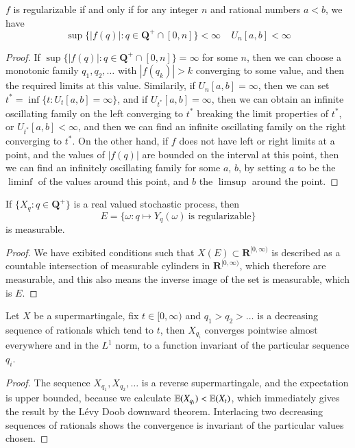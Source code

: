 \begin{lemma}
    $f$ is regularizable if and only if for any integer $n$ and rational numbers $a < b$, we have
    \[ \sup \{ |f(q)|: q \in \mathbf{Q}^+ \cap [0,n] \} < \infty\ \ \ \ \ U_n[a,b] < \infty \]
\end{lemma}
\begin{proof}
    If $\sup \{ |f(q)|: q \in \mathbf{Q}^+ \cap [0,n] \} = \infty$ for some $n$, then we can choose a monotonic family $q_1, q_2, \dots$ with $|f(q_k)| > k$ converging to some value, and then the required limits at this value. Similarily, if $U_n[a,b] = \infty$, then we can set $t^* = \inf \{ t: U_t[a,b] = \infty \}$, and if $U_{t^*}[a,b] = \infty$, then we can obtain an infinite oscillating family on the left converging to $t^*$ breaking the limit properties of $t^*$, or $U_{t^*}[a,b] < \infty$, and then we can find an infinite oscillating family on the right converging to $t^*$. On the other hand, if $f$ does not have left or right limits at a point, and the values of $|f(q)|$ are bounded on the interval at this point, then we can find an infinitely oscillating family for some $a$, $b$, by setting $a$ to be the $\liminf$ of the values around this point, and $b$ the $\limsup$ around the point.
\end{proof}

\begin{corollary}
    If $\{ X_q : q \in \mathbf{Q}^+ \}$ is a real valued stochastic process, then
    \[ E = \{ \omega: q \mapsto Y_q(\omega)\ \text{is regularizable} \} \]
    is measurable.
\end{corollary}
\begin{proof}
    We have exibited conditions such that $X(E) \subset \mathbf{R}^{[0,\infty)}$ is described as a countable intersection of measurable cylinders in $\mathbf{R}^{[0,\infty)}$, which therefore are measurable, and this also means the inverse image of the set is measurable, which is $E$.
\end{proof}

\begin{lemma}
    Let $X$ be a supermartingale, fix $t \in [0,\infty)$ and $q_1 > q_2 > \dots$ is a decreasing sequence of rationals which tend to $t$, then $X_{q_i}$ converges pointwise almost everywhere and in the $L^1$ norm, to a function invariant of the particular sequence $q_i$.
\end{lemma}
\begin{proof}
    The sequence $X_{q_1}, X_{q_2}, \dots$ is a reverse supermartingale, and the expectation is upper bounded, because we calculate $\operatorname{\mathbb{E}}(X_{q_i}) < \operatorname{\mathbb{E}}(X_t)$, which immediately gives the result by the L\'{e}vy Doob downward theorem. Interlacing two decreasing sequences of rationals shows the convergence is invariant of the particular values chosen.
\end{proof}

